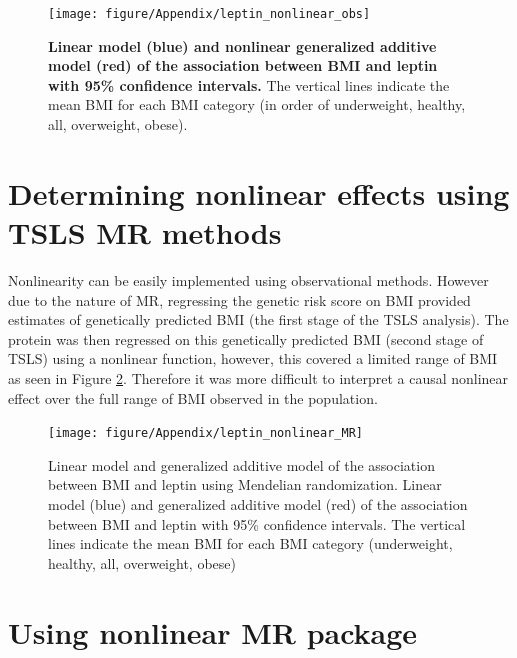 \documentclass[11pt,twoside]{bristolthesis}
\begin{document}
\begin{figure}
\texttt{[image: figure/Appendix/leptin\_nonlinear\_obs]} \caption[Linear model and generalized additive model of the association between BMI and leptin]{\textbf{Linear model (blue) and nonlinear generalized additive model (red) of the association between BMI and leptin with 95\% confidence intervals.} The vertical lines indicate the mean BMI for each BMI category (in order of underweight, healthy, all, overweight, obese).}\label{fig:leptin-lm-GAM}
\end{figure}
\hypertarget{determining-nonlinear-effects-using-tsls-mr-methods}{%
\section{Determining nonlinear effects using TSLS MR methods}\label{determining-nonlinear-effects-using-tsls-mr-methods}}

Nonlinearity can be easily implemented using observational methods. However due to the nature of MR, regressing the genetic risk score on BMI provided estimates of genetically predicted BMI (the first stage of the TSLS analysis). The protein was then regressed on this genetically predicted BMI (second stage of TSLS) using a nonlinear function, however, this covered a limited range of BMI as seen in Figure \ref{fig:leptin-lm-GAM-MR}. Therefore it was more difficult to interpret a causal nonlinear effect over the full range of BMI observed in the population.



\begin{figure}
\texttt{[image: figure/Appendix/leptin\_nonlinear\_MR]} \caption[Linear model and generalized additive model of the association between BMI and leptin using Mendelian randomization]{Linear model and generalized additive model of the association between BMI and leptin using Mendelian randomization. Linear model (blue) and generalized additive model (red) of the association between BMI and leptin with 95\% confidence intervals. The vertical lines indicate the mean BMI for each BMI category (underweight, healthy, all, overweight, obese)}\label{fig:leptin-lm-GAM-MR}
\end{figure}
\hypertarget{using-nonlinear-mr-package}{%
\section{Using nonlinear MR package}\label{using-nonlinear-mr-package}}
\end{document}
